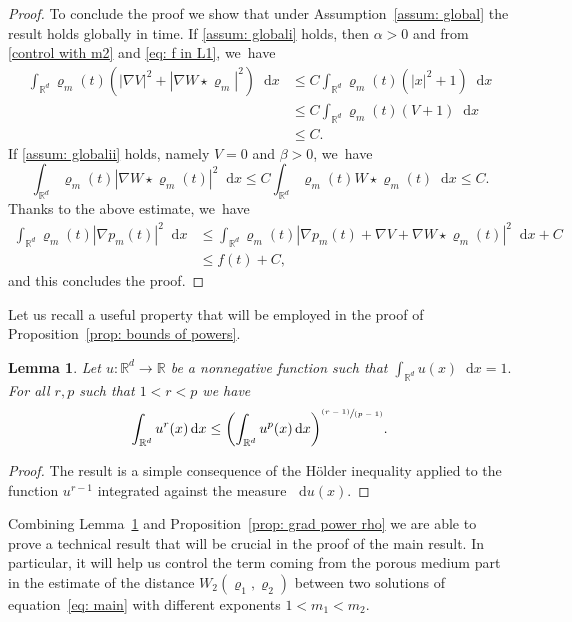 \documentclass[11pt]{article}
\numberwithin{equation}{section}
\newcommand{\pspfrac}[2]{\sfrac{(#1)}{(#2)}}
\newcommand{\bbprt}[1]{\biggl(#1\biggr)}
\newcommand{\dx}[1]{\mathop{}\!\mathrm{d} #1}
\newcommand{\R}{\mathbb{R}}
\theoremstyle{plain}
\newtheorem{lemma}[theorem]{Lemma}
\theoremstyle{remark}
\begin{document}
\begin{proof}
To conclude the proof we show that under Assumption~\ref{assum: global} the result holds globally in time.
If \eqref{assum: globali} holds, then $\alpha >0$ and from \eqref{control with m2} and \eqref{eq: f in L1}, we~have
\begin{align*}
\int_{\R^d} \varrho_m(t) (|\nabla V|^2 + |\nabla W\star \varrho_m|^2) \dx x&\leq C \int_{\R^d} \varrho_m(t) (|x|^2+1)\dx x \\&\leq C \int_{\R^d} \varrho_m(t) (V+1)\dx x\\&\leq C.
\end{align*}
If \eqref{assum: globalii} holds, namely $V=0$ and $\beta > 0$, we~have
\begin{equation*}
\int_{\R^d} \varrho_m(t) |\nabla W\star \varrho_m(t)|^2 \dx x \leq C \int_{\R^d} \varrho_m(t) W\star \varrho_m(t)\dx x\leq C.
\end{equation*}
Thanks to the above estimate, we~have
\begin{align*}
\int_{\R^d} \varrho_m(t) |\nabla p_m(t)|^2 \dx x&\leq \int_{\R^d} \varrho_m(t) |\nabla p_m(t)+\nabla V +\nabla W\star \varrho_m(t)|^2 \dx x + C\\
&\leq f(t) + C,
\end{align*}
and this concludes the proof.
\end{proof}

Let us recall a useful property that will be employed in the proof of Proposition~\ref{prop: bounds of powers}.
\begin{lemma}\label{lemma}
Let $u:\R^d\to \R$ be a nonnegative function such that $\int_{\R^d} u(x)\dx x=1.$ For all $r,p$ such that $1<r<p$ we have
\begin{equation*}
\int_{\R^d} u^r(x) \dx x \leq \bbprt{\int_{\R^d}u^p(x) \dx x}^{\pspfrac{r-1}{p-1}}.
\end{equation*}
\end{lemma}
\begin{proof}
The result is a simple consequence of the Hölder inequality applied to the function $u^{r-1}$ integrated against the measure $\dx u(x)$.
\end{proof}

Combining Lemma~\ref{lemma} and Proposition~\ref{prop: grad power rho} we are able to prove a technical result that will be crucial in the proof of the main result. In particular, it will help us control the term coming from the porous medium part in the estimate of the distance $W_2(\varrho_1,\varrho_2)$ between two solutions of equation~\eqref{eq: main} with different exponents \hbox{$1<m_1< m_2$}.
\end{document}
